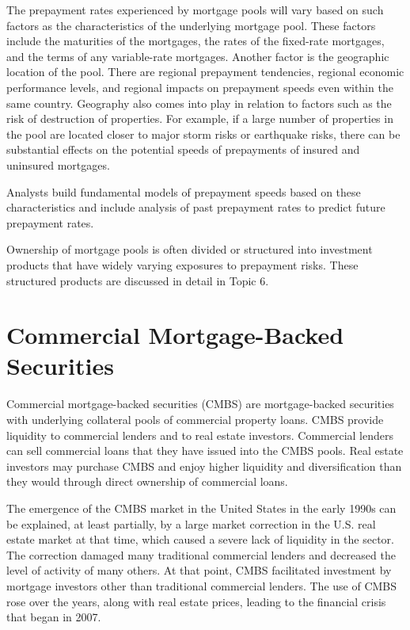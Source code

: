 \documentclass[11pt]{article}
\begin{document}
The prepayment rates experienced by mortgage pools will vary based on such factors as the characteristics of the underlying mortgage pool. These factors include the maturities of the mortgages, the rates of the fixed-rate mortgages, and the terms of any variable-rate mortgages. Another factor is the geographic location of the pool. There are regional prepayment tendencies, regional economic performance levels, and regional impacts on prepayment speeds even within the same country. Geography also comes into play in relation to factors such as the risk of destruction of properties. For example, if a large number of properties in the pool are located closer to major storm risks or earthquake risks, there can be substantial effects on the potential speeds of prepayments of insured and uninsured mortgages.

Analysts build fundamental models of prepayment speeds based on these characteristics and include analysis of past prepayment rates to predict future prepayment rates.

Ownership of mortgage pools is often divided or structured into investment products that have widely varying exposures to prepayment risks. These structured products are discussed in detail in Topic 6.

\section*{Commercial Mortgage-Backed Securities}
Commercial mortgage-backed securities (CMBS) are mortgage-backed securities with underlying collateral pools of commercial property loans. CMBS provide liquidity to commercial lenders and to real estate investors. Commercial lenders can sell commercial loans that they have issued into the CMBS pools. Real estate investors may purchase CMBS and enjoy higher liquidity and diversification than they would through direct ownership of commercial loans.

The emergence of the CMBS market in the United States in the early 1990s can be explained, at least partially, by a large market correction in the U.S. real estate market at that time, which caused a severe lack of liquidity in the sector. The correction damaged many traditional commercial lenders and decreased the level of activity of many others. At that point, CMBS facilitated investment by mortgage investors other than traditional commercial lenders. The use of CMBS rose over the years, along with real estate prices, leading to the financial crisis that began in 2007.
\end{document}
